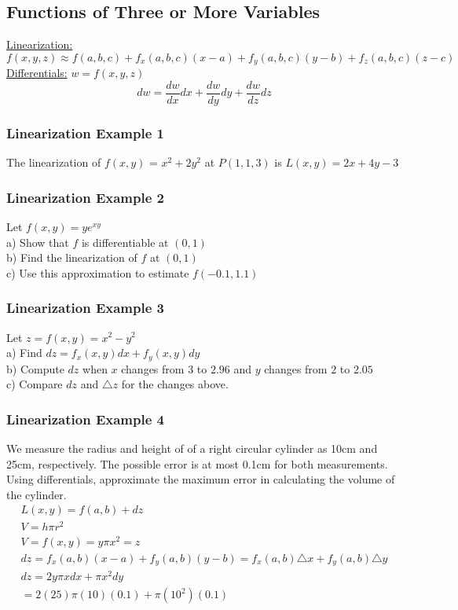 \documentclass[12pt]{article}
\begin{document}
\subsection{Functions of Three or More Variables}
\underline{Linearization:}
\[
	f(x,y,z) \approx f(a,b,c) + f_x(a,b,c)(x-a) + f_y(a,b,c)(y-b) + f_z(a,b,c)(z-c)
\]
\underline{Differentials:} \(w=f(x,y,z)\) 
\[
	dw=\frac{dw}{dx}dx + \frac{dw}{dy}dy + \frac{dw}{dz}dz
\]
\subsubsection{Linearization Example 1}
The linearization of \(f(x,y)\) = \(x^2+2y^2\) at \(P(1,1,3)\) is \(L(x,y) = 2x+4y-3\) 

\subsubsection{Linearization Example 2}
Let \(f(x,y) = ye^{xy}\) \\
a) Show that \(f\) is differentiable at \((0,1)\) \\
b) Find the linearization of \(f\) at \((0,1)\) \\
c) Use this approximation to estimate \(f(-0.1,1.1)\) 

\subsubsection{Linearization Example 3}
Let \(z=f(x,y)=x^2-y^2\) \\
a) Find \(dz=f_x(x,y)dx+f_y(x,y)dy\)\\
b) Compute \(dz\) when \(x\) changes from \(3\) to \(2.96\) and \(y\) changes from \(2\) to \(2.05\) \\
c) Compare \(dz\) and \(\triangle z\) for the changes above.

\subsubsection{Linearization Example 4}
We measure the radius and height of of a right circular cylinder as 10cm and 25cm, respectively.
The possible error is at most 0.1cm for both measurements. Using differentials, approximate the maximum error in calculating the volume of the cylinder.
\begin{align}
	\nonumber L(x,y) = f(a,b) + dz \\
 \nonumber V = h\pi r^2 \\
	V = f(x,y) = y\pi x^2 = z\\
	dz = f_x(a,b)(x - a) + f_y(a,b)(y-b) = f_x(a,b) \triangle x + f_y(a,b) \triangle y \\
	dz = 2y\pi x dx + \pi x^2 dy \\
	= 2(25)\pi (10) (0.1) + \pi (10^2) (0.1)  
\end{align}
\end{document}
